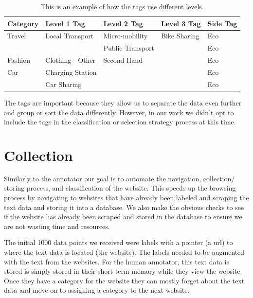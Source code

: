 \begin{table}[h]
\begin{tabular}{|l|l|l|l|l|}
\hline
Category    & Level 1 Tag           & Level 2 Tag        & Level 3 Tag  & Side Tag \\ \hline
Travel      & Local Transport       & Micro-mobility     & Bike Sharing & Eco      \\ \hline
            &                       & Public Transport   &              & Eco      \\ \hline
Fashion     & Clothing - Other      & Second Hand        &              & Eco      \\ \hline
Car         & Charging Station      &                    &              & Eco      \\ \hline
            & Car Sharing           &                    &              & Eco      \\ \hline
\end{tabular}
\caption{This is an example of how the tags use different levels.}
\label{tab:tags}
\end{table}

The tags are important because they allow us to separate the data even further and group or sort the data differently. However, in our work we didn't opt to include the tags in the classification or selection strategy process at this time.

\section{Collection}

Similarly to the annotator our goal is to automate the navigation, collection/ storing process, and classification of the website. This speeds up the browsing process by navigating to websites that have already been labeled and scraping the text data and storing it into a database. We also make the obvious checks to see if the website has already been scraped and stored in the database to ensure we are not wasting time and resources.

The initial 1000 data points we received were labels with a pointer (a url) to where the text data is located (the website). The labels needed to be augmented with the text from the websites. For the human annotator, this text data is stored is simply stored in their short term memory while they view the website. Once they have a category for the website they can mostly forget about the text data and move on to assigning a category to the next website.

